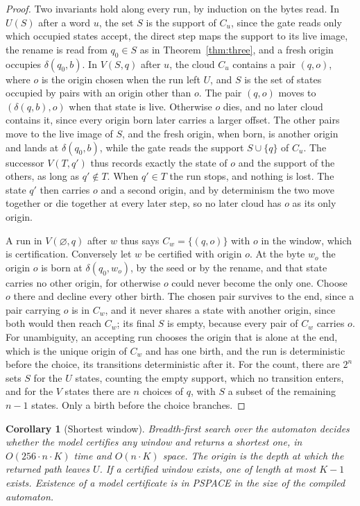\documentclass[11pt,a4paper]{article}
\theoremstyle{definition}
\theoremstyle{plain}
\newtheorem{corollary}{Corollary}
\begin{document}
\begin{proof}
Two invariants hold along every run, by induction on the bytes read. In $U(S)$ after a word $u$, the set $S$ is the
support of $C_u$, since the gate reads only which occupied states accept, the direct step maps the support to its live
image, the rename is read from $q_0 \in S$ as in Theorem~\ref{thm:three}, and a fresh origin occupies $\delta(q_0, b)$.
In $V(S, q)$ after $u$, the cloud $C_u$ contains a pair $(q, o)$, where $o$ is the origin chosen when the run left $U$,
and $S$ is the set of states occupied by pairs with an origin other than $o$. The pair $(q, o)$ moves to
$(\delta(q, b), o)$ when that state is live. Otherwise $o$ dies, and no later cloud contains it, since every origin born
later carries a larger offset. The other pairs move to the live image of $S$, and the fresh origin, when born, is
another origin and lands at $\delta(q_0, b)$, while the gate reads the support $S \cup \{q\}$ of $C_u$. The successor
$V(T, q')$ thus records exactly the state of $o$ and the support of the others, as long as $q' \notin T$. When
$q' \in T$ the run stops, and nothing is lost. The state $q'$ then carries $o$ and a second origin, and by determinism
the two move together or die together at every later step, so no later cloud has $o$ as its only origin.

A run in $V(\varnothing, q)$ after $w$ thus says $C_w = \{(q, o)\}$ with $o$ in the window, which is certification.
Conversely let $w$ be certified with origin $o$. At the byte $w_o$ the origin $o$ is born at $\delta(q_0, w_o)$, by the
seed or by the rename, and that state carries no other origin, for otherwise $o$ could never become the only one. Choose
$o$ there and decline every other birth. The chosen pair survives to the end, since a pair carrying $o$ is in $C_w$, and
it never shares a state with another origin, since both would then reach $C_w$; its final $S$ is empty, because every
pair of $C_w$ carries $o$. For unambiguity, an accepting run chooses the origin that is alone at the end, which is the
unique origin of $C_w$ and has one birth, and the run is deterministic before the choice, its transitions deterministic
after it. For the count, there are $2^n$ sets $S$ for the $U$ states, counting the empty support, which no transition
enters, and for the $V$ states there are $n$ choices of $q$, with $S$ a subset of the remaining $n - 1$ states. Only a
birth before the choice branches.
\end{proof}

\begin{corollary}[Shortest window]
\label{cor:chosen}
Breadth-first search over the automaton decides whether the model certifies any window and returns a shortest one, in
$O(256 \cdot n \cdot K)$ time and $O(n \cdot K)$ space. The origin is the depth at which the returned path leaves $U$.
If a certified window exists, one of length at most $K - 1$ exists. Existence of a model certificate is in PSPACE in the
size of the compiled automaton.
\end{corollary}
\end{document}
